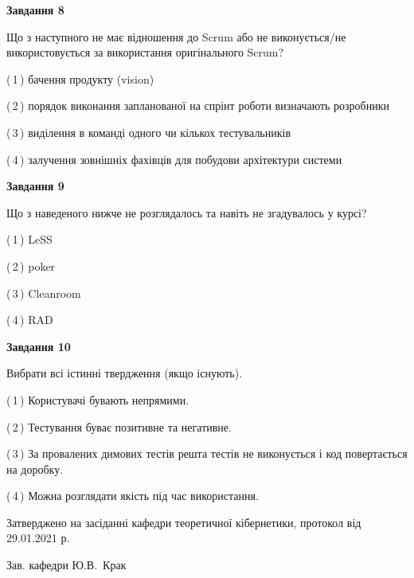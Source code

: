 \documentclass[10pt, ukrainian]{article}
\begin{document}
{\begin {large}
{\begin {center}\textbf{Завдання 8}\end {center}}\par
Що з наступного не має відношення до Scrum або не виконується/не використовується за використання оригінального Scrum?\par
\vspace{2mm}



(\,1\,) бачення продукту (vision) %



(\,2\,) порядок виконання запланованої на спрінт роботи визначають розробники%



(\,3\,) виділення в команді одного чи кількох тестувальників%



(\,4\,) залучення зовнішніх фахівців для побудови архітектури системи%


{\begin {center}\textbf{Завдання 9}\end {center}}\par
Що з наведеного нижче не розглядалось та навіть не згадувалось у курсі?\par
\vspace{2mm}



(\,1\,) LeSS%



(\,2\,) poker%



(\,3\,) Cleanroom%



(\,4\,) RAD%


{\begin {center}\textbf{Завдання 10}\end {center}}\par
Вибрати всі істинні твердження (якщо існують).\par
\vspace{2mm}



(\,1\,) Користувачі бувають непрямими.%



(\,2\,) Тестування буває позитивне та негативне.%



(\,3\,) За провалених димових тестів решта тестів не виконується і код повертається на доробку.%



(\,4\,) Можна розглядати якість під час використання.%



\end {large}}
{\vspace{5mm}\smallskip \begin {small} Затверджено на засіданні кафедри теоретичної кібернетики, протокол  від   29.01.2021 р.\par\smallskip\smallskip
{\parbox {6.5 cm}{Зав. кафедри \dotfill Ю.В.~Крак}} \end{small}}
\newpage
\end{document}
